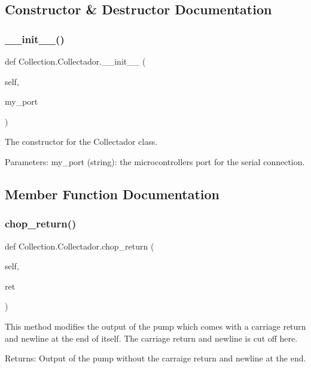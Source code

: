 \subsection{Constructor \& Destructor Documentation}
\mbox{\label{class_collection_1_1_collectador_af9b0ad6313049442cdc6e924a017693e}} 
\subsubsection{\texorpdfstring{\_\_init\_\_()}{\_\_init\_\_()}}
{\footnotesize\ttfamily def Collection.\+Collectador.\+\_\+\+\_\+init\+\_\+\+\_\+ (\begin{DoxyParamCaption}\item[{}]{self,  }\item[{}]{my\+\_\+port }\end{DoxyParamCaption})}

\begin{DoxyVerb}The constructor for the Collectador class.

Parameters:
    my_port (string): the microcontrollers port for the serial connection.
\end{DoxyVerb}
 

\subsection{Member Function Documentation}
\mbox{\label{class_collection_1_1_collectador_a1fcc60319735e3e18d938c84073aef20}} 
\subsubsection{\texorpdfstring{chop\_return()}{chop\_return()}}
{\footnotesize\ttfamily def Collection.\+Collectador.\+chop\+\_\+return (\begin{DoxyParamCaption}\item[{}]{self,  }\item[{}]{ret }\end{DoxyParamCaption})}

\begin{DoxyVerb}This method modifies the output of the pump which comes with a carriage return and newline at the end of itself.
The carriage return and newline is cut off here.

Returns:
    Output of the pump without the carraige return and newline at the end.
\end{DoxyVerb}
 \mbox{\label{class_collection_1_1_collectador_a4e3a010e6084283e311c019de7f7cc5b}} 
